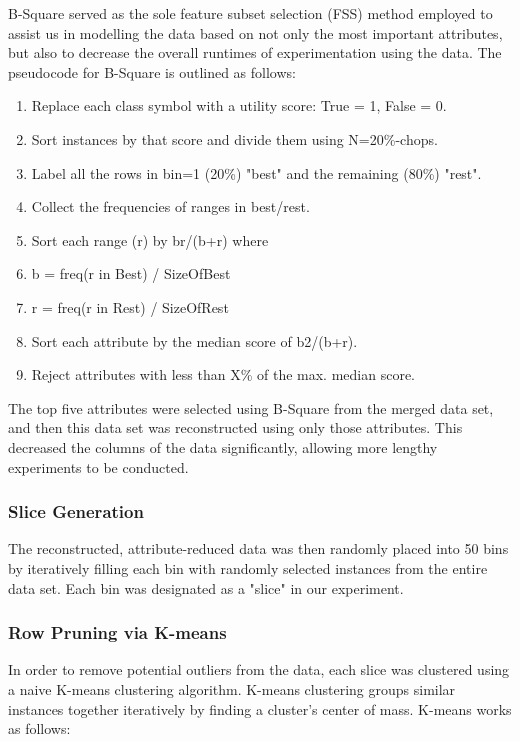 \documentclass{sig-alternate}
\begin{document}
B-Square served as the sole feature subset selection (FSS) method employed to assist us in modelling the data based on not only the most important attributes, but also to decrease the overall runtimes of experimentation using the data. The pseudocode for B-Square is outlined as follows:

\begin{centering}
\begin{enumerate}
\item Replace each class symbol with a utility score: True = 1, False = 0.
\item Sort instances by that score and divide them using N=20\%-chops.
\item Label all the rows in bin=1 (20\%) "best" and the remaining (80\%) "rest".
\item Collect the frequencies of ranges in best/rest.
\item Sort each range (r) by b^^2/(b+r) where
\item b = freq(r in Best) / SizeOfBest
\item r = freq(r in Rest) / SizeOfRest
\item Sort each attribute by the median score of b2/(b+r).
\item Reject attributes with less than X\% of the max. median score. 
\end{enumerate}
\end{centering}

The top five attributes were selected using B-Square from the merged data set, and then this data set was reconstructed using only those attributes. This decreased the columns of the data significantly, allowing more lengthy experiments to be conducted.

\subsubsection{Slice Generation}

The reconstructed, attribute-reduced data was then randomly placed into 50 bins by iteratively filling each bin with randomly selected instances from the entire data set. Each bin was designated as a "slice" in our experiment.

\subsubsection{Row Pruning via K-means}

In order to remove potential outliers from the data, each slice was clustered using a naive K-means clustering algorithm. K-means clustering groups similar instances together iteratively by finding a cluster's center of mass. K-means works as follows:
\end{document}
